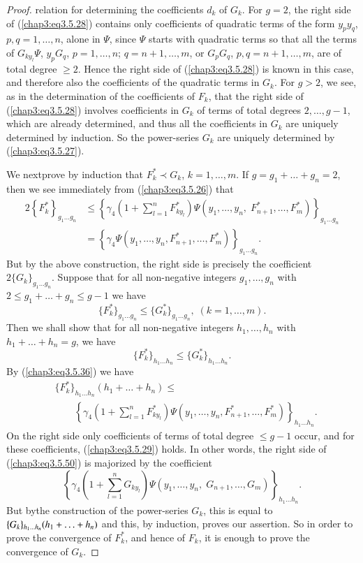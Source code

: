 \begin{proof}
relation for determining the coefficients $d_k$ of $G_k$. For $g =2$,
the right side of (\ref{chap3:eq3.5.28}) contains only coefficients of
quadratic terms of the form $y_p y_q$, $p, q= 1, \ldots, n$, alone in
$\Psi$, since $\Psi$ starts with quadratic terms so that all the terms
of $G_{ky_l} \Psi$, $y_p G_q$, $p =1, \ldots, n$; $q = n +1, \ldots,
m$, or $G_p G_q$, $p,q=n+1, \ldots, m$, are of total degree $\geq
2$. Hence the right side of (\ref{chap3:eq3.5.28}) is known in this
case, and therefore also the coefficients of the quadratic terms in
$G_k$. For $g>2$, we see, as in the determination of the coefficients
of $F_k$, that the right side of (\ref{chap3:eq3.5.28}) involves
coefficients in $G_k$ of terms of total degrees $2, \ldots, g-1$,
which are already determined, and thus all the coefficients in $G_k$
are uniquely determined by induction. So the power-series $G_k$ are
uniquely determined by (\ref{chap3:eq3.5.27}). 

We next\pageoriginale prove by induction that $F^*_k \prec G_k$, $k=1,
\ldots, m$. If $g= g_1 + \ldots + g_n =2$, then we see immediately
from (\ref{chap3:eq3.5.26}) that  
\begin{align*}
2 \left\{F^*_k \right\}_{g_1 \ldots g_n} & \leq \left\{\gamma_4
\left(1+\sum\limits^n_{l=1} F^*_{ky_l} \right) \Psi (y_1 , \ldots,
y_n, \; F^*_{n+1}, \ldots, F^*_m) \right\}_{g_1 \ldots g_n}\\ 
& = \left\{ \gamma_4 \Psi (y_1 ,\ldots, y_n, F^*_{n+1}, \ldots,
F^*_m)\right\}_{g_1 \ldots g_n}. 
\end{align*}
But by the above construction, the right side is precisely the
coefficient $2\{G_k\}_{g_1 \ldots g_n}$. Suppose that for all
non-negative integers $g_1, \ldots, g_n$ with $2 \leq g_1 + \ldots +
g_n \leq g-1$ we have 
\begin{equation*}
\{F^*_k\}_{g_1 \ldots g_n} \leq \{G^*_k\}_{g_1 \ldots g_n}, \; (k=1,
\ldots, m). \tag{3.5.29}\label{chap3:eq3.5.29} 
\end{equation*}
Then we shall show that for all non-negative integers $h_1, \ldots,
h_n$ with $h_1 + \ldots + h_n = g$, we have  
$$
\{F^*_k\}_{h_1 \ldots h_n} \leq \{G^*_k\}_{h_1 \ldots h_n}. 
$$
By (\ref{chap3:eq3.5.36}) we have
\begin{align*}
&\{F^*_k\}_{h_1 \ldots h_n} (h_1 + \ldots + h_n) \leq\\ 
&\qquad\left\{\gamma_4 \left(1+ \sum\limits^n_{l=1} F^*_{ky_l} \right) 
  \Psi (y_1, \ldots, y_n, F^*_{n+1}, \ldots, F^*_m) \right\}_{h_1
    \ldots h_n}.  
\tag{3.5.30}\label{chap3:eq3.5.30}
\end{align*}
On the right side only coefficients of terms of total degree $\leq g
-1$ occur, and for these coefficients, (\ref{chap3:eq3.5.29})
holds. In other words, the right side of (\ref{chap3:eq3.5.50}) is
majorized by the coefficient 
$$ 
\left\{\gamma_4 \left(1+ \sum\limits^n_{l=1} G_{ky_l} \right) \Psi
(y_1, \ldots, y_n, \; G_{n+1}, \ldots, G_m) \right\}_{h_1 \ldots h_n}.  
$$
But by\pageoriginale the construction of the power-series $G_k$, this
is equal to $\{G_{k}\}_{h_1 \ldots h_n}\break (h_1 + \ldots + h_n)$ and
this, by induction, proves our assertion. So in order to prove the
convergence of $F^*_k$, and hence of $F_k$, it is enough to prove the
convergence of $G_k$. 


\end{proof}
